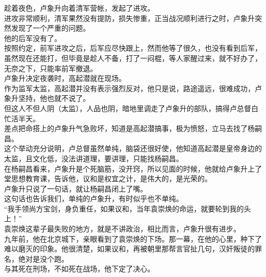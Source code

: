 \begin{multicols}{\theparacolNo}
趁着夜色，卢象升向着清军营帐，发起了进攻。\\

进攻非常顺利，清军果然没有提防，损失惨重，正当战况顺利进行之时，卢象升突然发现了一个严重的问题。\\

他的后军没有了。\\

按照约定，前军进攻之后，后军应尽快跟上，然而他等了很久，也没有看到后军，虽然现在还能打，但毕竟是趁人不备，打了一闷棍，等人家醒过来，就不好办了，无奈之下，只能率前军撤退。\\

卢象升决定夜袭时，高起潜就在现场。\\

作为监军太监，高起潜并没有表示强烈反对，他只是说，路途遥远，很难成功，卢象升坚持，他也就不说了。\\

但这人不但人阴（太监），人品也阴，暗地里调走了卢象升的部队，搞得卢总督白忙活半天。\\

差点把命搭上的卢象升气急败坏，知道是高起潜搞事，极为愤怒，立马去找了杨嗣昌。\\

这个举动充分说明，卢总督虽然单纯，脑袋还很好使，他知道高起潜是皇帝身边的太监，且文化低，没法讲道理，要讲理，只能找杨嗣昌。\\

在杨嗣昌看来，卢象升是个死脑筋，没开窍，所以见面的时候，他就给卢象升上了堂思想教育课，告诉他，议和是权宜之计，是伟大的，是光荣的。\\

卢象升只说了一句话，就让杨嗣昌闭上了嘴。\\

这句话也告诉我们，单纯的卢象升，有时似乎也不单纯。\\

“我手领尚方宝剑，身负重任，如果议和，当年袁崇焕的命运，就要轮到我的头上！”\\

袁崇焕这辈子最失败的地方，就是不讲政治，相比而言，卢象升很有进步。\\

九年前，他在北京城下，亲眼看到了袁崇焕的下场。那一幕，在他的心里，种下了难以磨灭的印象。他很清楚，如果议和，再被朝里那帮言官扯几句，汉奸叛徒的罪名，绝对是没个跑。\\

与其死在刑场，不如死在战场，他下定了决心。\\


\end{multicols}
